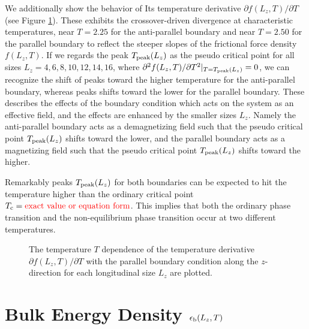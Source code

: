 We additionally show the behavior of Its temperature derivative $\partial f(L_{z}, T)/\partial T$ (see Figure \ref{fig:dFricDens_Allsize}). These exhibits the crossover-driven divergence at characteristic temperatures, near $T=2.25$ for the anti-parallel boundary and near $T=2.50$ for the parallel boundary to reflect the steeper slopes of the frictional force density $f(L_{z}, T)$. If we regards the peak $T_{\rm peak}(L_{z})$ as the pseudo critical point for all sizes $L_{z}=4,6,8,10,12,14,16$, where $\partial^{2} f(L_{z}, T)/\partial T^{2}|_{T=T_{\rm peak}(L_{z})} = 0$, we can recognize the shift of peaks toward the higher temperature for the anti-parallel boundary, whereas peaks shifts toward the lower for the parallel boundary. These describes the effects of the boundary condition which acts on the system as an effective field, and the effects are enhanced by the smaller sizes $L_{z}$. Namely the anti-parallel boundary acts as a demagnetizing field such that the pseudo critical point $T_{\rm peak}(L_{z})$ shifts toward the lower, and the parallel boundary acts as a magnetizing field such that the pseudo critical point $T_{\rm peak}(L_{z})$ shifts toward the higher.

Remarkably peaks $T_{\rm peak}(L_{z})$ for both boundaries can be expected to hit the temperature higher than the ordinary critical point $T_{\rm c}=\text{\textcolor{red}{exact value or equation form}}$. This implies that both the ordinary phase transition and the non-equilibrium phase transition occur at two different temperatures.

\begin{figure}[htbp]
	\centering
	
	\caption{The temperature $T$ dependence of the temperature derivative $\partial f(L_{z}, T)/\partial T$ with the parallel boundary condition along the $z$-direction for each longitudinal size $L_{z}$ are plotted.}
	\label{fig:dFricDens_Allsize}
\end{figure}

\section{Bulk Energy Density $\epsilon_{\rm b}(L_{z}, T)$}

